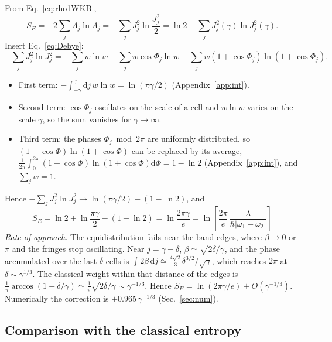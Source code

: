 \documentclass[aps,pra,onecolumn,notitlepage,nofootinbib,11pt]{revtex4-2}
\newcommand{\dd}{\mathrm{d}}
\begin{document}
From Eq.~\eqref{eq:rho1WKB},
\begin{equation}
S_{E}=-2\sum_{j}\Lambda_{j}\ln\Lambda_{j}=-\sum_{j}J_{j}^{2}\ln\frac{J_{j}^{2}}{2}
=\ln2-\sum_{j}J_{j}^{2}(\gamma)\ln J_{j}^{2}(\gamma).
\label{eq:SE1}
\end{equation}
Insert Eq.~\eqref{eq:Debye}:
\begin{equation}
-\sum_{j}J_{j}^{2}\ln J_{j}^{2}=-\sum_{j}w\ln w-\sum_{j}w\cos\Phi_{j}\ln w
-\sum_{j}w(1+\cos\Phi_{j})\ln(1+\cos\Phi_{j}).
\end{equation}
\begin{itemize}
\item First term: $-\int_{-\gamma}^{\gamma}\dd j\,w\ln w=\ln(\pi\gamma/2)$ (Appendix~\ref{app:int}).
\item Second term: $\cos\Phi_{j}$ oscillates on the scale of a cell and $w\ln w$ varies on
the scale $\gamma$, so the sum vanishes for $\gamma\to\infty$.
\item Third term: the phases $\Phi_{j}\bmod2\pi$ are uniformly distributed, so
$(1+\cos\Phi)\ln(1+\cos\Phi)$ can be replaced by its average,
$\frac{1}{2\pi}\int_{0}^{2\pi}(1+\cos\Phi)\ln(1+\cos\Phi)\dd\Phi=1-\ln2$ (Appendix~\ref{app:int}),
and $\sum_{j}w=1$.
\end{itemize}
Hence $-\sum_{j}J_{j}^{2}\ln J_{j}^{2}\to\ln(\pi\gamma/2)-(1-\ln2)$, and
\begin{equation}
\boxed{\;S_{E}=\ln2+\ln\frac{\pi\gamma}{2}-(1-\ln2)=\ln\frac{2\pi\gamma}{e}
=\ln\left[\frac{2\pi}{e}\,\frac{\lambda}{\hbar|\omega_{1}-\omega_{2}|}\right]\;}
\label{eq:SE}
\end{equation}
\emph{Rate of approach.} The equidistribution fails near the band edges, where
$\beta\to0$ or $\pi$ and the fringes stop oscillating. Near $j=\gamma-\delta$,
$\beta\simeq\sqrt{2\delta/\gamma}$, and the phase accumulated over the last $\delta$ cells
is $\int2\beta\,\dd j\simeq\frac{4\sqrt2}{3}\delta^{3/2}/\sqrt\gamma$, which reaches $2\pi$
at $\delta\sim\gamma^{1/3}$. The classical weight within that distance of the edges is
$\frac1\pi\arccos(1-\delta/\gamma)\simeq\frac1\pi\sqrt{2\delta/\gamma}\sim\gamma^{-1/3}$. Hence
$S_{E}=\ln(2\pi\gamma/e)+O(\gamma^{-1/3})$. Numerically the correction is
$+0.965\,\gamma^{-1/3}$ (Sec.~\ref{sec:num}).

\subsection{Comparison with the classical entropy}
\end{document}
